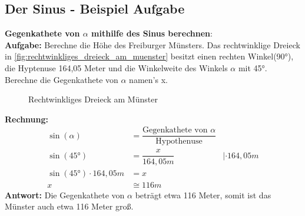 \subsection{Der Sinus - Beispiel Aufgabe}
\textbf{Gegenkathete von $\alpha$ mithilfe des Sinus berechnen}: \\
\textbf{Aufgabe:} Berechne die Höhe des Freiburger Münsters. Das rechtwinklige Dreieck in \autoref{fig:rechtwinkliges_dreieck_am_muenster} besitzt einen rechten Winkel(90°), die Hyptenuse 164,05 Meter und die Winkelweite des Winkels $\alpha$ mit 45°. Berechne die Gegenkathete von $\alpha$ namen's x.
\begin{figure}[hb!]
  \centering
  \def\svgwidth{300px}
  
  \caption{Rechtwinkliges Dreieck am Münster}
  \label{fig:rechtwinkliges_dreieck_am_muenster}
\end{figure}
\textbf{Rechnung:}
\begin{align}
  \sin(\alpha)            & = \dfrac{\text{Gegenkathete von $\alpha$}}{\text{Hypothenuse}} \tag{1}                  \\
  \sin(45°)               & = \dfrac{x}{164,05m}                                                   & |\cdot 164,05m \\
  \sin(45°) \cdot 164,05m & = x                                                                                     \\
  x                       & \cong 116m
\end{align}
\textbf{Antwort:} Die Gegenkathete von $\alpha$ beträgt etwa 116 Meter, somit ist das Münster auch etwa 116 Meter groß.
\newpage

